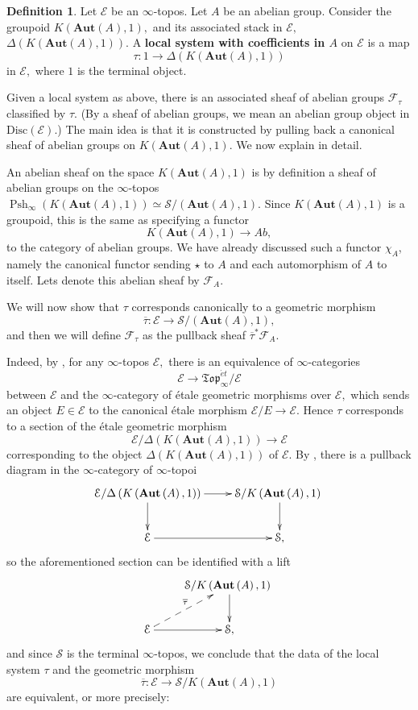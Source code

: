 \documentclass[12pt]{amsart}
\theoremstyle{definition}
\newtheorem{definition}[dummy]{Definition}
\newcommand{\cE}{\mathcal{E}}
\newcommand{\cF}{\mathcal{F}}
\newcommand{\cS}{\mathcal{S}}
\newcommand{\et}{\acute{e}t}
\renewcommand{\i}{\infty}
\def\Pshi{\operatorname{Psh}_\i}
\def\Aut{\mathbf{Aut}}
\def\Disc{\mbox{Disc}}
\begin{document}
\begin{definition}
Let $\cE$ be an $\i$-topos. Let $A$ be an abelian group. Consider the groupoid $K\left(\Aut\left(A\right),1\right),$ and its associated stack in $\cE,$ $\Delta\left(K\left(\Aut\left(A\right),1\right)\right).$ A \textbf{local system with coefficients in $A$} on $\cE$ is a map $$\tau:1 \to \Delta\left(K\left(\Aut\left(A\right),1\right)\right)$$ in $\cE,$ where $1$ is the terminal object.
\end{definition}

Given a local system as above, there is an associated sheaf of abelian groups $\cF_\tau$ classified by $\tau.$ (By a sheaf of abelian groups, we mean an abelian group object in $\Disc\left(\cE\right).$) The main idea is that it is constructed by pulling back a canonical sheaf of abelian groups on $K\left(\Aut\left(A\right),1\right).$ We now explain in detail.

An abelian sheaf on the space $K\left(\Aut\left(A\right),1\right)$ is by definition a  sheaf of abelian groups on the $\i$-topos $\Pshi\left(K\left(\Aut\left(A\right),1\right)\right) \simeq \cS/\left(\Aut\left(A\right),1\right).$ Since $K\left(\Aut\left(A\right),1\right)$ is a groupoid, this is the same as specifying a functor $$K\left(\Aut\left(A\right),1\right) \to Ab,$$ to the category of abelian groups. We have already discussed such a functor $\chi_A$, namely the canonical functor sending $\star$ to $A$ and each automorphism of $A$ to itself. Lets denote this abelian sheaf by $\cF_A.$

We will now show that $\tau$ corresponds canonically to a geometric morphism $$\overline{\tau}:\cE \to \cS/\left(\Aut\left(A\right),1\right),$$ and then we will define $\cF_\tau$ as the pullback sheaf $\overline{\tau}^*\cF_A.$

Indeed, by \cite[Remark 6.3.5.10]{htt}, for any $\i$-topos $\cE,$ there is an equivalence of $\i$-categories
$$\cE \to \mathfrak{Top}_\i^{\et}/\cE$$ between $\cE$ and the $\i$-category of \'etale geometric morphisms over $\cE,$ which sends an object $E \in \cE$ to the canonical \'etale morphism $\cE/E \to \cE.$ Hence $\tau$ corresponds to a section of the \'etale geometric morphism $$\cE/\Delta\left(K\left(\Aut\left(A\right),1\right)\right) \to \cE$$ corresponding to the object $\Delta\left(K\left(\Aut\left(A\right),1\right)\right)$ of $\cE.$ By \cite[Proposition 6.3.5.8]{htt}, there is a pullback diagram in the $\i$-category of $\i$-topoi
$$\xymatrix{\cE/\Delta\left(K\left(\Aut\left(A\right),1\right)\right) \ar[r] \ar[d] & \cS/K\left(\Aut\left(A\right),1\right)\ \ar[d] \\
\cE \ar[r] & \cS,}$$
so the aforementioned section can be identified with a lift 
$$\xymatrix{& \cS/K\left(\Aut\left(A\right),1\right)\ \ar[d] \\
\cE \ar[r] \ar@{-->}[ru]^{\overline{\tau}} & \cS,}$$
and since $\cS$ is the terminal $\i$-topos, we conclude that the data of the local system $\tau$ and the geometric morphism $$\overline{\tau}:\cE \to \cS/K\left(\Aut\left(A\right),1\right)$$ are equivalent, or more precisely:
\end{document}
